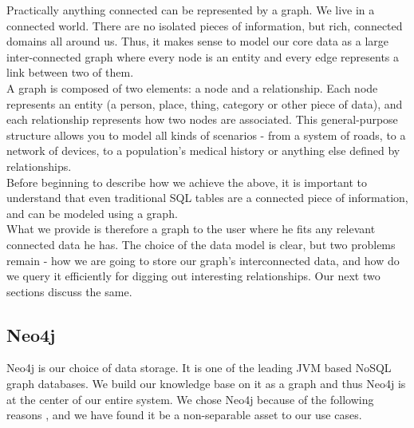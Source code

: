 Practically anything connected can be represented by a graph. We live in a connected world. There are no isolated pieces of information, but rich, connected domains all around us. Thus, it makes sense to model our core data as a large inter-connected graph where every node is an entity and every edge represents a link between two of them.   \\



A graph is composed of two elements: a node and a relationship. Each node represents an entity (a person, place, thing, category or other piece of data), and each relationship represents how two nodes are associated. This general-purpose structure allows you to model all kinds of scenarios - from a system of roads, to a network of devices, to a population's medical history or anything else defined by relationships.  \\

Before beginning to describe how we achieve the above, it is important to understand that even traditional SQL tables are a connected piece of information, and can be modeled using a graph. \\

What we provide is therefore a graph to the user where he fits any relevant connected data he has. The choice of the data model is clear, but two problems remain - how we are going to store our graph's interconnected data, and how do we query it efficiently for digging out interesting relationships. Our next two sections discuss the same. \\

\subsection{Neo4j}

Neo4j \cite{neo}  is our choice of data storage. It is one of the leading JVM based NoSQL graph databases. We build our knowledge base on it as a graph and thus Neo4j is at the center of our entire system. We chose Neo4j because of the following reasons , and we have found it be a non-separable asset to our use cases. \cite{neogdb} \\

